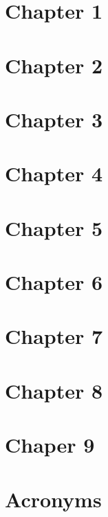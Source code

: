 \documentclass[12pt, a4paper]{article}
\begin{document}
\begin{multicols*}{2}
	\section{Chapter 1}
	
	
	\section{Chapter 2}
	
	
	
	\section{Chapter 3}
	
	
	
	\section{Chapter 4}
	
	
	\section{Chapter 5}
	
	
	\section{Chapter 6}
	
	
	\section{Chapter 7}
	
	
	\section{Chapter 8}
	
	
	\section{Chaper 9}
	
	
	\newpage
	\section{Acronyms}
	


\end{multicols*}	
\end{document}
